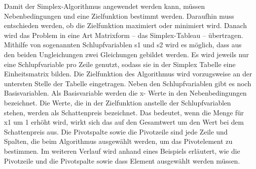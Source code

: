 Damit der Simplex-Algorithmus angewendet werden kann, müssen Nebenbedingungen und eine Zielfunktion bestimmt werden. Daraufhin muss entschieden werden, ob die Zielfunktion maximiert oder minimiert wird. Danach wird das Problem in eine Art Matrixform – das Simplex-Tableau – übertragen. Mithilfe von sogenannten Schlupfvariablen s1 und s2 wird es möglich, dass aus den beiden Ungleichungen zwei Gleichungen gebildet werden. Es wird jeweils nur eine Schlupfvariable pro Zeile genutzt, sodass sie in der Simplex Tabelle eine Einheitsmatrix bilden. Die Zielfunktion des Algorithmus wird vorzugsweise an der untersten Stelle der Tabelle eingetragen. Neben den Schlupfvariablen gibt es noch Basisvariablen. Als Basisvariable werden die x- Werte in den Nebenbedingungen bezeichnet. Die Werte, die in der Zielfunktion anstelle der Schlupfvariablen stehen, werden als Schattenpreis bezeichnet. Das bedeutet, wenn die Menge für x1 um 1 erhöht wird, wirkt sich das auf den Gesamtwert um den Wert bei dem Schattenpreis aus. Die Pivotspalte sowie die Pivotzeile sind jede Zeile und Spalten, die beim Algorithmus ausgewählt werden, um das Pivotelement zu bestimmen. Im weiteren Verlauf wird anhand eines Beispiels erläutert, wie die Pivotzeile und die Pivotspalte sowie dass Element ausgewählt werden müssen.





